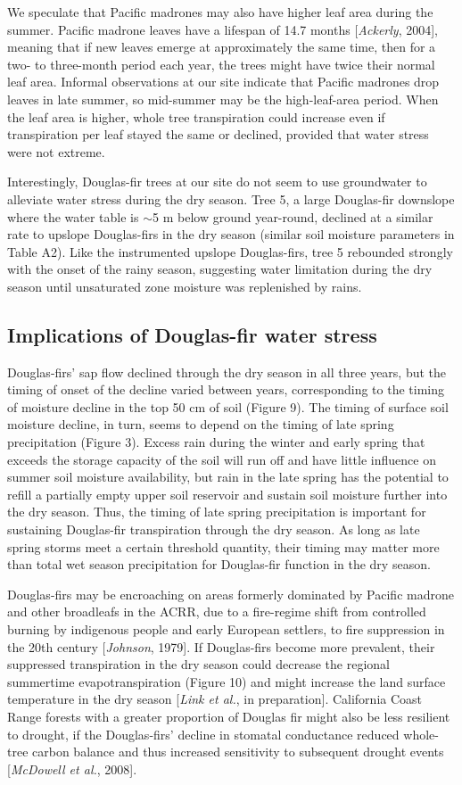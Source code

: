 We speculate that Pacific madrones may also have higher leaf area during the summer.  Pacific madrone leaves have a lifespan of 14.7 months [\textit{Ackerly}, 2004], meaning that if new leaves emerge at approximately the same time, then for a two- to three-month period each year, the trees might have twice their normal leaf area.  Informal observations at our site indicate that Pacific madrones drop leaves in late summer, so mid-summer may be the high-leaf-area period.  When the leaf area is higher, whole tree transpiration could increase even if transpiration per leaf stayed the same or declined, provided that water stress were not extreme.

Interestingly, Douglas-fir trees at our site do not seem to use groundwater to alleviate water stress during the dry season.  Tree 5, a large Douglas-fir downslope where the water table is $\sim$5 m below ground year-round, declined at a similar rate to upslope Douglas-firs in the dry season (similar soil moisture parameters in Table A2).  Like the instrumented upslope Douglas-firs, tree 5 rebounded strongly with the onset of the rainy season, suggesting water limitation during the dry season until unsaturated zone moisture was replenished by rains.

\subsection{Implications of Douglas-fir water stress}
Douglas-firs' sap flow declined through the dry season in all three years, but the timing of onset of the decline varied between years, corresponding to the timing of moisture decline in the top 50 cm of soil (Figure 9).  The timing of surface soil moisture decline, in turn, seems to depend on the timing of late spring precipitation (Figure 3).  Excess rain during the winter and early spring that exceeds the storage capacity of the soil will run off and have little influence on summer soil moisture availability, but rain in the late spring has the potential to refill a partially empty upper soil reservoir and sustain soil moisture further into the dry season.  Thus, the timing of late spring precipitation is important for sustaining Douglas-fir transpiration through the dry season.  As long as late spring storms meet a certain threshold quantity, their timing may matter more than total wet season precipitation for Douglas-fir function in the dry season.

Douglas-firs may be encroaching on areas formerly dominated by Pacific madrone and other broadleafs in the ACRR, due to a fire-regime shift from controlled burning by indigenous people and early European settlers, to fire suppression in the 20th century [\textit{Johnson}, 1979].  If Douglas-firs become more prevalent, their suppressed transpiration in the dry season could decrease the regional summertime evapotranspiration (Figure 10) and might increase the land surface temperature in the dry season [\textit{Link et al.}, in preparation].  California Coast Range forests with a greater proportion of Douglas fir might also be less resilient to drought, if the Douglas-firs' decline in stomatal conductance reduced whole-tree carbon balance and thus increased sensitivity to subsequent drought events [\textit{McDowell et al.}, 2008].

